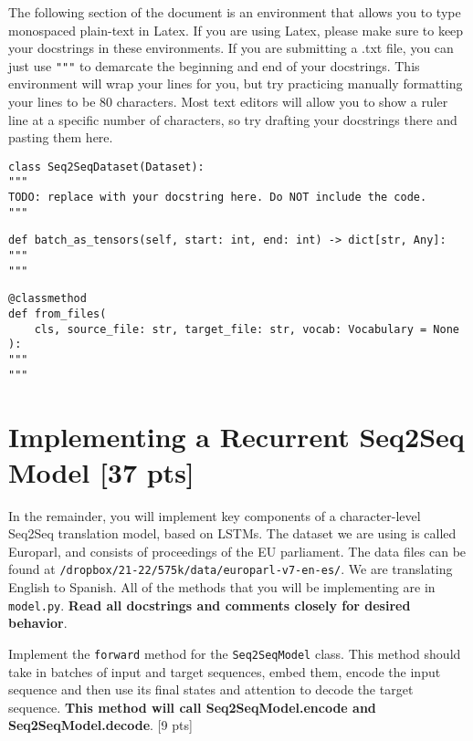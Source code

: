 \documentclass[11pt]{article}
\begin{document}
The following section of the document is an environment that allows you to type monospaced plain-text in Latex. If you are using Latex, please make sure to keep your docstrings in these environments. If you are submitting a .txt file, you can just use \texttt{"""} to demarcate the beginning and end of your docstrings. This environment will wrap your lines for you, but try practicing manually formatting your lines to be 80 characters. Most text editors will allow you to show a ruler line at a specific number of characters, so try drafting your docstrings there and pasting them here.

\begin{lstlisting}
class Seq2SeqDataset(Dataset):
"""
TODO: replace with your docstring here. Do NOT include the code.
"""
\end{lstlisting}

\begin{lstlisting}
def batch_as_tensors(self, start: int, end: int) -> dict[str, Any]:
"""
"""
\end{lstlisting}

\begin{lstlisting}
@classmethod
def from_files(
    cls, source_file: str, target_file: str, vocab: Vocabulary = None
):
"""
"""
\end{lstlisting}

\section{Implementing a Recurrent Seq2Seq Model [37 pts]}

In the remainder, you will implement key components of a character-level Seq2Seq translation model, based on LSTMs. The dataset we are using is called Europarl, and consists of proceedings of the EU parliament. The data files can be found at \texttt{/dropbox/21-22/575k/data/europarl-v7-en-es/}. We are translating English to Spanish. All of the methods that you will be implementing are in \texttt{model.py}. \textbf{Read all docstrings and comments closely for desired behavior}.

\vspace{2em}
 Implement the \texttt{forward} method for the \texttt{Seq2SeqModel} class. This method should take in batches of input and target sequences, embed them, encode the input sequence and then use its final states and attention to decode the target sequence. \textbf{This method will call Seq2SeqModel.encode and Seq2SeqModel.decode}. \hfill [9 pts]
\end{document}
